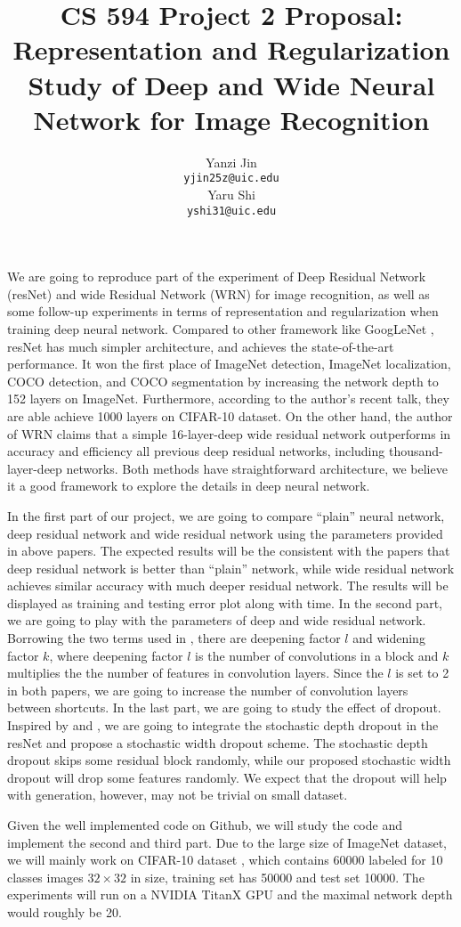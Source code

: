 \documentclass{article} %
\title{CS 594 Project 2 Proposal: Representation and Regularization Study of Deep and Wide Neural Network for Image Recognition}
\author{
Yanzi Jin \\
\texttt{yjin25z@uic.edu} \\
\And
Yaru Shi \\
\texttt{yshi31@uic.edu} \\
}
\begin{document}
\maketitle

We are going to reproduce part of the experiment of Deep Residual Network (resNet) \cite{he2015deep} and wide Residual Network (WRN) \cite{zagoruyko2016wide} for image recognition, as well as some follow-up experiments in terms of representation and regularization when training deep neural network. Compared to other framework like GoogLeNet \cite{szegedy2015going}, resNet has much simpler architecture, and achieves the state-of-the-art performance. It won the first place of ImageNet detection, ImageNet localization, COCO detection, and COCO segmentation by increasing the network depth to 152 layers on ImageNet. Furthermore, according to the author's recent talk, they are able achieve 1000 layers on CIFAR-10 dataset. On the other hand, the author of WRN claims that a simple 16-layer-deep wide residual network outperforms in accuracy and efficiency all previous deep residual networks, including thousand-layer-deep networks. Both methods have straightforward architecture, we believe it a good framework to explore the details in deep neural network. 

In the first part of our project, we are going to compare ``plain'' neural network, deep residual network and wide residual network using the parameters provided in above papers. The expected results will be the consistent with the papers that deep residual network is better than ``plain'' network, while wide residual network achieves similar accuracy with much deeper residual network. The results will be displayed as training and testing error plot along with time. In the second part, we are going to play with the parameters of deep and wide residual network. Borrowing the two terms used in \cite{zagoruyko2016wide}, there are deepening factor $l$ and widening factor $k$, where deepening factor $l$ is the number of convolutions in a block and $k$ multiplies the the number of features in convolution layers. Since the $l$ is set to 2 in both papers, we are going to increase the number of convolution layers between shortcuts. In the last part, we are going to study the effect of dropout. Inspired by \cite{he2016identity} and \cite{DBLP:journals/corr/HuangSLSW16}, we are going to integrate the stochastic depth dropout in the resNet and propose a stochastic width dropout scheme. The stochastic depth dropout skips some residual block randomly, while our proposed stochastic width dropout will drop some features randomly. We expect that the dropout will help with generation, however, may not be trivial on small dataset.

Given the well implemented code on Github, we will study the code and implement the second and third part. Due to the large size of ImageNet dataset, we will mainly work on CIFAR-10 dataset \cite{krizhevsky2009learning}, which contains 60000 labeled for 10 classes images $32\times32$ in size, training set has 50000 and test set 10000. The experiments will run on a NVIDIA TitanX GPU and the maximal network depth would roughly be 20. 


 
\end{document}
